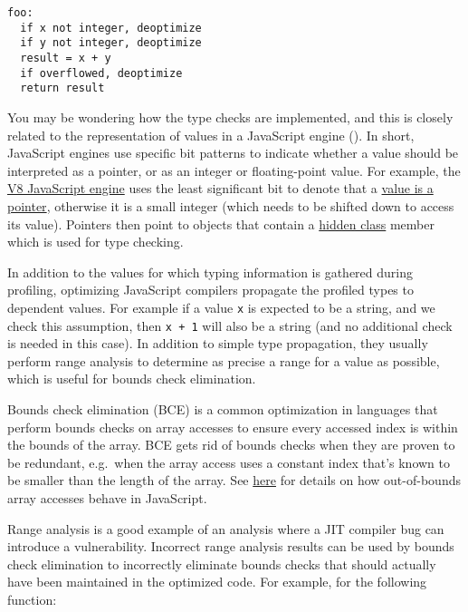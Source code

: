 \documentclass[
  a4paper,
]{report}
\begin{document}
\begin{verbatim}
foo:
  if x not integer, deoptimize
  if y not integer, deoptimize
  result = x + y
  if overflowed, deoptimize
  return result
\end{verbatim}

You may be wondering how the type checks are implemented, and this is
closely related to the representation of values in a JavaScript engine
(). In short, JavaScript engines use
specific bit patterns to indicate whether a value should be interpreted
as a pointer, or as an integer or floating-point value. For example, the
\href{https://v8.dev/}{V8 JavaScript engine} uses the least significant
bit to denote that a
\href{https://v8.dev/blog/pointer-compression\#value-tagging-in-v8}{value
is a pointer}, otherwise it is a small integer (which needs to be
shifted down to access its value). Pointers then point to objects that
contain a \href{https://v8.dev/docs/hidden-classes}{hidden class} member
which is used for type checking.

In addition to the values for which typing information is gathered
during profiling, optimizing JavaScript compilers propagate the profiled
types to dependent values. For example if a value \texttt{x} is expected
to be a string, and we check this assumption, then \texttt{x\ +\ 1} will
also be a string (and no additional check is needed in this case). In
addition to simple type propagation, they usually perform
\label{__index_entry_94}{range
analysis} to determine as precise a range for a
value as possible, which is useful for
\label{__index_entry_95}{bounds check
elimination}.

\label{__index_entry_96}{Bounds check elimination
(BCE)} is a common optimization in
languages that perform bounds checks on array accesses to ensure every
accessed index is within the bounds of the array. BCE gets rid of bounds
checks when they are proven to be redundant, e.g.~when the array access
uses a constant index that's known to be smaller than the length of the
array. See
\href{https://developer.mozilla.org/en-US/docs/Web/JavaScript/Reference/Global_Objects/Array/length}{here}
for details on how out-of-bounds array accesses behave in JavaScript.

Range analysis is a good example of an analysis where a JIT compiler bug
can introduce a vulnerability. Incorrect range analysis results can be
used by bounds check elimination to incorrectly eliminate bounds checks
that should actually have been maintained in the optimized code. For
example, for the following function:
\end{document}
